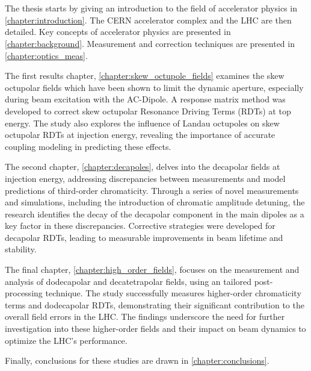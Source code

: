 \section{}

The thesis starts by giving an introduction to the field of accelerator physics in
\cref{chapter:introduction}. The CERN accelerator complex and the LHC are then detailed.
Key concepts of accelerator physics are presented in \cref{chapter:background}. Measurement and
correction techniques are presented in \cref{chapter:optics_meas}.

The first results chapter, \cref{chapter:skew_octupole_fields} examines the skew octupolar fields
which have been shown to limit the dynamic aperture, especially during beam excitation with the
AC-Dipole. A response matrix method was developed to correct skew octupolar Resonance Driving Terms
(RDTs) at top energy. The study also explores the influence of Landau octupoles on skew octupolar
RDTs at injection energy, revealing the importance of accurate coupling modeling in predicting these
effects.

The second chapter, \cref{chapter:decapoles}, delves into the decapolar fields at injection energy,
addressing discrepancies between measurements and model predictions of third-order chromaticity.
Through a series of novel measurements and simulations, including the introduction of chromatic
amplitude detuning, the research identifies the decay of the decapolar component in the main dipoles
as a key factor in these discrepancies. Corrective strategies were developed for decapolar RDTs,
leading to measurable improvements in beam lifetime and stability.

The final chapter, \cref{chapter:high_order_fields}, focuses on the measurement and analysis of
dodecapolar and decatetrapolar fields, using an tailored post-processing technique. The study
successfully measures higher-order chromaticity terms and dodecapolar RDTs, demonstrating their
significant contribution to the overall field errors in the LHC. The findings underscore the need
for further investigation into these higher-order fields and their impact on beam dynamics to
optimize the LHC's performance.

Finally, conclusions for these studies are drawn in \cref{chapter:conclusions}.